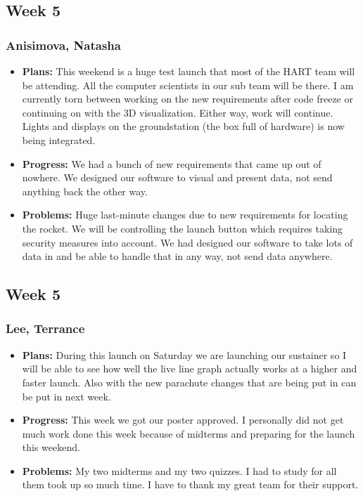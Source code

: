 \documentclass[10pt,draftclsnofoot,onecolumn]{IEEEtran}
\begin{document}
\subsection{Week 5}
\subsubsection{Anisimova, Natasha}
\begin{itemize}
	\item \textbf{Plans: }This weekend is a huge test launch that most of the HART team will be attending. All the computer scientists in our sub team will be there. I am currently torn between working on the new requirements after code freeze or continuing on with the 3D visualization. Either way, work will continue. Lights and displays on the groundstation (the box full of hardware) is now being integrated.
	\item \textbf{Progress:  }
	We had a bunch of new requirements that came up out of nowhere. We designed our software to visual and present data, not send anything back the other way.
	\item \textbf{Problems: }
	Huge last-minute changes due to new requirements for locating the rocket. We will be controlling the launch button which requires taking security measures into account. We had designed our software to take lots of data in and be able to handle that in any way, not send data anywhere.
\end{itemize}

\subsection{Week 5}
\subsubsection{Lee, Terrance}
\begin{itemize}
	\item \textbf{Plans: }
	During this launch on Saturday we are launching our sustainer so I will be able to see how well the live line graph actually works at a higher and faster launch. Also with the new parachute changes that are being put in can be put in next week.
	\item \textbf{Progress:  }
	This week we got our poster approved. I personally did not get much work done this week because of midterms and preparing for the launch this weekend.
	\item \textbf{Problems: }
	My two midterms and my two quizzes. I had to study for all them took up so much time. I have to thank my great team for their support.
\end{itemize}
\end{document}
